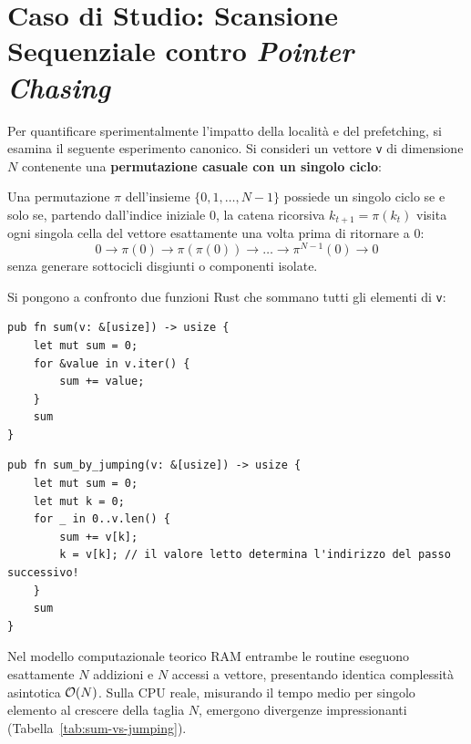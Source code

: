 \FloatBarrier
\section{Caso di Studio: Scansione Sequenziale contro \textit{Pointer Chasing}}
\label{sec:caso-studio-pointer-chasing}

Per quantificare sperimentalmente l'impatto della localit\`a e del prefetching, si esamina il seguente esperimento canonico. Si consideri un vettore \texttt{v} di dimensione $N$ contenente una \textbf{permutazione casuale con un singolo ciclo}:

\begin{definition}
Una permutazione $\pi$ dell'insieme $\{0, 1, \dots, N-1\}$ possiede un singolo ciclo se e solo se, partendo dall'indice iniziale $0$, la catena ricorsiva $k_{t+1} = \pi(k_t)$ visita ogni singola cella del vettore esattamente una volta prima di ritornare a $0$:
\begin{equation}
0 \to \pi(0) \to \pi(\pi(0)) \to \dots \to \pi^{N-1}(0) \to 0
\end{equation}
senza generare sottocicli disgiunti o componenti isolate.
\end{definition}

Si pongono a confronto due funzioni Rust che sommano tutti gli elementi di \texttt{v}:

\begin{lstlisting}[style=rustcode,caption={Scansione sequenziale con localit\`a spaziale e prefetching.}]
pub fn sum(v: &[usize]) -> usize {
    let mut sum = 0;
    for &value in v.iter() {
        sum += value;
    }
    sum
}
\end{lstlisting}

\begin{lstlisting}[style=rustcode,caption={Scansione disordinata per salti casuali (\textit{pointer chasing}).}]
pub fn sum_by_jumping(v: &[usize]) -> usize {
    let mut sum = 0;
    let mut k = 0;
    for _ in 0..v.len() {
        sum += v[k];
        k = v[k]; // il valore letto determina l'indirizzo del passo successivo!
    }
    sum
}
\end{lstlisting}

Nel modello computazionale teorico RAM entrambe le routine eseguono esattamente $N$ addizioni e $N$ accessi a vettore, presentando identica complessit\`a asintotica $\mathcal{O}\!\left(N\right)$. Sulla CPU reale, misurando il tempo medio per singolo elemento al crescere della taglia $N$, emergono divergenze impressionanti (Tabella~\ref{tab:sum-vs-jumping}).

